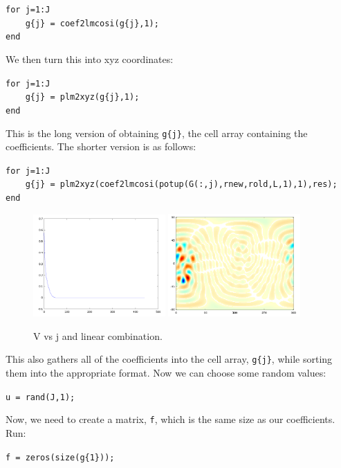 \documentclass[11pt]{article}
\begin{document}
\verb+for j=1:J+\\
\verb+    g{j} = coef2lmcosi(g{j},1);+\\
\verb+end+

We then turn this into xyz coordinates:

\verb+for j=1:J+\\
\verb+    g{j} = plm2xyz(g{j},1);+\\
\verb+end+

This is the long version of obtaining \verb+g{j}+, the cell array containing the coefficients.  The shorter version is as follows:

\verb+for j=1:J+\\
\verb+    g{j} = plm2xyz(coef2lmcosi(potup(G(:,j),rnew,rold,L,1),1),res);+\\
\verb+end+

\begin{figure}
  \includegraphics[width=0.45\textwidth]{figures/Vvsj.png}
  \includegraphics[width=0.45\textwidth]{figures/lincomb.png}
  \caption{V vs j and linear combination.}
\label{lincomb}
\end{figure}

This also gathers all of the coefficients into the cell array, \verb+g{j}+, while sorting them into the appropriate format.  Now we can choose some random values:

\verb+u = rand(J,1);+

Now, we need to create a matrix, \verb+f+, which is the same size as our coefficients. Run:

\verb+f = zeros(size(g{1}));+
\end{document}
